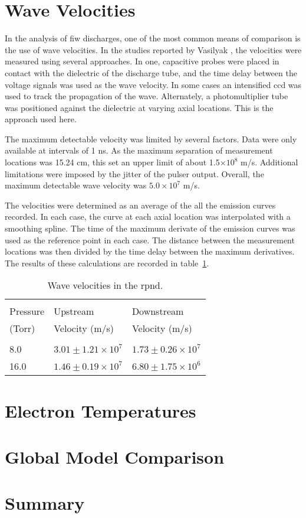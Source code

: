 \section{Wave Velocities}

In the analysis of \acs{fiw} discharges, one of the most common means of
comparison is the use of wave velocities. In the studies reported by Vasilyak
\cite{Vasilyak1994}, the velocities were measured using several approaches. In
one, capacitive probes were placed in contact with the dielectric of the
discharge tube, and the time delay between the voltage signals was used as the
wave velocity. In some cases an intensified \acs{ccd} was used to track the
propagation of the wave. Alternately, a photomultiplier tube was positioned
against the dielectric at varying axial locations. This is the approach used
here.

The maximum detectable velocity was limited by several factors. Data were only
available at intervals of 1 ns. As the maximum separation of measurement
locations was 15.24 cm, this set an upper limit of about 1.5$\times10^8$ m/s.
Additional limitations were imposed by the jitter of the pulser output. Overall,
the maximum detectable wave velocity was $5.0\times10^7$ m/s.

The velocities were determined as an average of the all the emission curves
recorded. In each case, the curve at each axial location was interpolated with a
smoothing spline. The time of the maximum derivate of the emission curves was
used as the reference point in each case. The distance between the measurement
locations was then divided by the time delay between the maximum derivatives.
The results of these calculations are recorded in table~\ref{tbl:velocities}.
\begin{table}
  \centering
  \caption{Wave velocities in the \acs{rpnd}.}
  \label{tbl:velocities}
  \begin{tabular}{lll}
    \toprule                                                      \\
    Pressure  & Upstream                & Downstream              \\
    (Torr)    & Velocity (m/s)          & Velocity (m/s)          \\
    \midrule                                                      \\
    8.0       & $3.01\pm1.21\times10^7$ & $1.73\pm0.26\times10^7$ \\
    16.0      & $1.46\pm0.19\times10^7$ & $6.80\pm1.75\times10^6$ \\
  \end{tabular}
\end{table}


\section{Electron Temperatures}



\section{Global Model Comparison}



\section{Summary}
